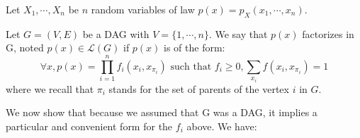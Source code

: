 \documentclass[12pt]{report}
\begin{document}
Let $X_1, \cdots, X_n$ be $n$ random variables of law $p(x) = p_X (x_1, \cdots, x_n)$. 
\begin{definition}
Let $G = (V,E)$ be a DAG with $V = \{1,\cdots, n\}$. We say that $p(x)$ factorizes in G, noted $p(x)\in \mathcal{L}(G)$ if $p(x)$ is of the form:
\begin{equation}
\forall x, p(x) = \prod_{i=1}^n f_i(x_i, x_{\pi_i}) \text{ such that } f_i\geq 0, \sum_{x_i} f(x_i, x_{\pi_i}) = 1
\end{equation}
where we recall that $\pi_i$ stands for the set of parents of the vertex $i$ in $G$.
\end{definition}

We now show that because we assumed that G was a DAG, it implies a particular and convenient form for the $f_i$ above. We have: 
\end{document}
